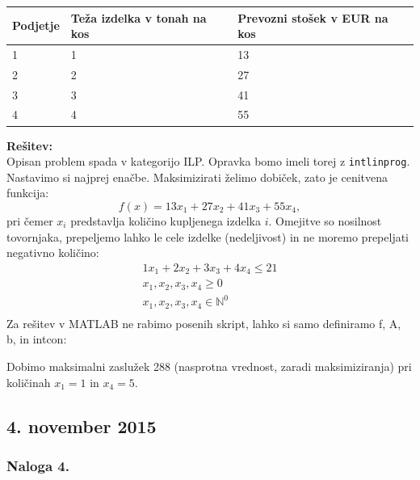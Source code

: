 \documentclass[a4paper,11pt]{article}
\begin{document}
\begin{table} \centering
\begin{tabular}{ | l | p{3cm} | p{3cm} |}
\hline
Podjetje & Teža izdelka v tonah na kos & Prevozni stošek v EUR na kos  \\
\hline
1 & 1 & 13 \\
\hline
2 & 2 & 27 \\
\hline
3 & 3 & 41 \\
\hline
4 & 4 & 55 \\
\hline
\end{tabular}
\end{table}

\vspace{5mm} \noindent \textbf{Rešitev:} \\
Opisan problem spada v kategorijo ILP. Opravka bomo imeli torej z \texttt{intlinprog}. Nastavimo si najprej enačbe. Maksimizirati želimo dobiček, zato je cenitvena funkcija:
\begin{equation*}
f(x) = 13x_1 + 27x_2 + 41x_3 + 55x_4,
\end{equation*}
pri čemer $x_i$ predstavlja količino kupljenega izdelka $i$. Omejitve so nosilnost tovornjaka, prepeljemo lahko le cele izdelke (nedeljivost) in ne moremo prepeljati negativno količino:
\begin{equation*}
\begin{gathered}
1x_1 + 2x_2 + 3x_3 + 4x_4 \leq 21 \\
x_1, x_2, x_3, x_4 \geq 0 \\
x_1, x_2, x_3, x_4 \in \mathbb{N}^0  \\
\end{gathered}
\end{equation*}
Za rešitev v MATLAB ne rabimo posenih skript, lahko si samo definiramo f, A, b, in intcon:

Dobimo maksimalni zaslužek 288 (nasprotna vrednost, zaradi maksimiziranja) pri količinah $x_1 = 1$ in $x_4=5$.
     

\subsection{4. november 2015}

\subsubsection{Naloga 4.}
\end{document}

